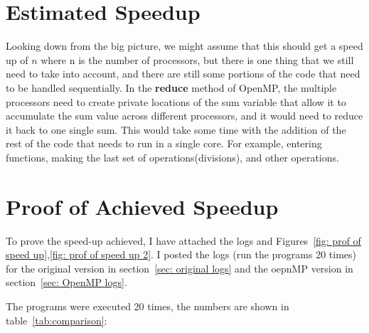 \documentclass{article}
\begin{document}


\section{Estimated Speedup } \label{sec: expected speed up}
Looking down from the big picture, we might assume that this should get a speed up of $n$ where n is the number of processors, but there is one thing that we still need to take into account, and there are still some portions of the code that need to be handled sequentially.
In the \textbf{reduce} method of OpenMP, the multiple processors need to create private locations of the sum variable that allow it to accumulate the sum value across different processors, and it would need to reduce it back to one single sum. This would take some time with the addition of the rest of the code that needs to run in a single core. For example, entering functions, making the last set of operations(divisions), and other operations.


\section{Proof of Achieved Speedup} \label{sec:speedup}
To prove the speed-up achieved, I have attached the logs and Figures~\ref{fig: prof of speed up},\ref{fig: prof of speed up 2}. I posted the logs (run the programs 20 times) for the original version in section~\ref{sec: original logs} and the oepnMP version in section~\ref{sec: OpenMP logs}.

The programs were executed 20 times, the numbers are shown in table~\ref{tab:comparison}:
\end{document}
